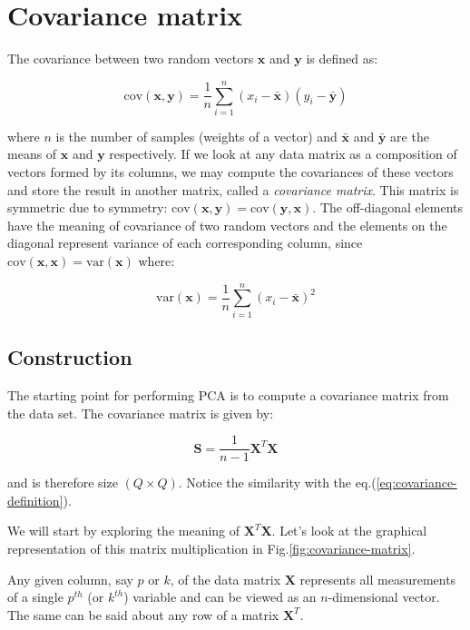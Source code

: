 \documentclass[10pt,twocolumn]{article}
\begin{document}
\section{Covariance matrix}

The covariance between two random vectors $\bm{x}$ and $\bm{y}$ is defined as:

\begin{equation}\label{eq:covariance-definition}
\text{cov}(\bm{x},\bm{y}) = \frac{1}{n} \sum_{i=1}^{n} (x_i - \bar{\bm{x}}) (y_i - \bar{\bm{y}})
\end{equation}

where $n$ is the number of samples (weights of a vector) and $\bar{\bm{x}}$ and $\bar{\bm{y}}$ are the means of $\bm{x}$ and $\bm{y}$ respectively. If we look at any data matrix as a composition of vectors formed by its columns, we may compute the covariances of these vectors and store the result in another matrix, called a \textit{covariance matrix}. This matrix is symmetric due to symmetry: $\text{cov}(\bm{x},\bm{y}) = \text{cov}(\bm{y},\bm{x})$. The off-diagonal elements have the meaning of covariance of two random vectors and the elements on the diagonal represent variance of each corresponding column, since $\text{cov}(\bm{x},\bm{x}) = \text{var}(\bm{x})$ where:

\begin{equation}\label{eq:variance-definition}
\text{var}(\bm{x}) = \frac{1}{n} \sum_{i=1}^{n} (x_i - \bar{\bm{x}})^2
\end{equation}

\subsection{Construction}

The starting point for performing PCA is to compute a covariance matrix from the data set. The covariance matrix is given by:

\begin{equation}\label{eq:cov-matrix}
\bm{S} = \frac{1}{n-1} \bm{X}^T \bm{X}
\end{equation}

and is therefore size $(Q \times Q)$. Notice the similarity with the eq.(\ref{eq:covariance-definition}).

We will start by exploring the meaning of $\bm{X}^T \bm{X}$. Let's look at the graphical representation of this matrix multiplication in Fig.\ref{fig:covariance-matrix}.

Any given column, say $p$ or $k$, of the data matrix $\bm{X}$ represents all measurements of a single $p^{th}$ (or $k^{th}$) variable and can be viewed as an $n$-dimensional vector. The same can be said about any row of a matrix $\bm{X}^T$.
\end{document}

